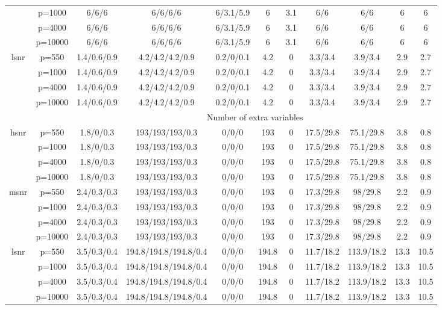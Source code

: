 \begin{table}[ht]
{\begin{tabular}{|c|c|ccccccccc|}
   & p=1000 & 6/6/6 & 6/6/6/6 & 6/3.1/5.9 & 6 & 3.1 & 6/6 & 6/6 & 6 & 6 \\ 
   & p=4000 & 6/6/6 & 6/6/6/6 & 6/3.1/5.9 & 6 & 3.1 & 6/6 & 6/6 & 6 & 6 \\ 
   & p=10000 & 6/6/6 & 6/6/6/6 & 6/3.1/5.9 & 6 & 3.1 & 6/6 & 6/6 & 6 & 6 \\ 
  \midrule\multirow{4}[2]{*}{lsnr} & p=550 & 1.4/0.6/0.9 & 4.2/4.2/4.2/0.9 & 0.2/0/0.1 & 4.2 & 0 & 3.3/3.4 & 3.9/3.4 & 2.9 & 2.7 \\ 
   & p=1000 & 1.4/0.6/0.9 & 4.2/4.2/4.2/0.9 & 0.2/0/0.1 & 4.2 & 0 & 3.3/3.4 & 3.9/3.4 & 2.9 & 2.7 \\ 
   & p=4000 & 1.4/0.6/0.9 & 4.2/4.2/4.2/0.9 & 0.2/0/0.1 & 4.2 & 0 & 3.3/3.4 & 3.9/3.4 & 2.9 & 2.7 \\ 
   & p=10000 & 1.4/0.6/0.9 & 4.2/4.2/4.2/0.9 & 0.2/0/0.1 & 4.2 & 0 & 3.3/3.4 & 3.9/3.4 & 2.9 & 2.7 \\ 
   \midrule 
 \multicolumn{1}{|c}{} &       & \multicolumn{9}{c|}{Number of extra variables} \\
\midrule\multirow{4}[2]{*}{hsnr} & p=550 & 1.8/0/0.3 & 193/193/193/0.3 & 0/0/0 & 193 & 0 & 17.5/29.8 & 75.1/29.8 & 3.8 & 0.8 \\ 
   & p=1000 & 1.8/0/0.3 & 193/193/193/0.3 & 0/0/0 & 193 & 0 & 17.5/29.8 & 75.1/29.8 & 3.8 & 0.8 \\ 
   & p=4000 & 1.8/0/0.3 & 193/193/193/0.3 & 0/0/0 & 193 & 0 & 17.5/29.8 & 75.1/29.8 & 3.8 & 0.8 \\ 
   & p=10000 & 1.8/0/0.3 & 193/193/193/0.3 & 0/0/0 & 193 & 0 & 17.5/29.8 & 75.1/29.8 & 3.8 & 0.8 \\ 
  \midrule\multirow{4}[2]{*}{msnr} & p=550 & 2.4/0.3/0.3 & 193/193/193/0.3 & 0/0/0 & 193 & 0 & 17.3/29.8 & 98/29.8 & 2.2 & 0.9 \\ 
   & p=1000 & 2.4/0.3/0.3 & 193/193/193/0.3 & 0/0/0 & 193 & 0 & 17.3/29.8 & 98/29.8 & 2.2 & 0.9 \\ 
   & p=4000 & 2.4/0.3/0.3 & 193/193/193/0.3 & 0/0/0 & 193 & 0 & 17.3/29.8 & 98/29.8 & 2.2 & 0.9 \\ 
   & p=10000 & 2.4/0.3/0.3 & 193/193/193/0.3 & 0/0/0 & 193 & 0 & 17.3/29.8 & 98/29.8 & 2.2 & 0.9 \\ 
  \midrule\multirow{4}[2]{*}{lsnr} & p=550 & 3.5/0.3/0.4 & 194.8/194.8/194.8/0.4 & 0/0/0 & 194.8 & 0 & 11.7/18.2 & 113.9/18.2 & 13.3 & 10.5 \\ 
   & p=1000 & 3.5/0.3/0.4 & 194.8/194.8/194.8/0.4 & 0/0/0 & 194.8 & 0 & 11.7/18.2 & 113.9/18.2 & 13.3 & 10.5 \\ 
   & p=4000 & 3.5/0.3/0.4 & 194.8/194.8/194.8/0.4 & 0/0/0 & 194.8 & 0 & 11.7/18.2 & 113.9/18.2 & 13.3 & 10.5 \\ 
   & p=10000 & 3.5/0.3/0.4 & 194.8/194.8/194.8/0.4 & 0/0/0 & 194.8 & 0 & 11.7/18.2 & 113.9/18.2 & 13.3 & 10.5 \\ 
   \bottomrule 
\end{tabular}
}
\end{table}
